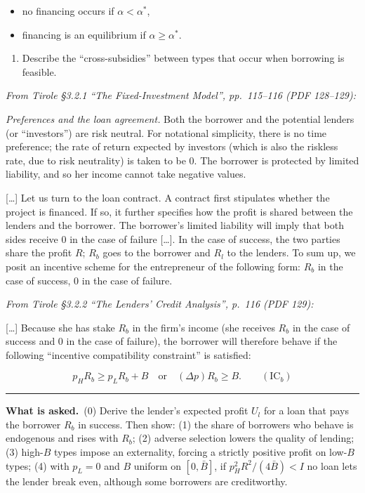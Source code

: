 \documentclass[11pt,a4paper]{article}
\newcommand{\asked}{\par\medskip\noindent\textbf{What is asked.}~}
\providecommand{\tightlist}{\setlength{\itemsep}{0pt}\setlength{\parskip}{0pt}}
\newcommand{\stmtend}{\par\endgroup\nopagebreak\noindent\rule{\linewidth}{0.4pt}\par\medskip}
\begin{document}
\begin{itemize}
\tightlist
\item
  no financing occurs if \(\alpha < \alpha^*\),
\item
  financing is an equilibrium if \(\alpha \geqslant \alpha^*\).
\end{itemize}

\begin{enumerate}
\def\labelenumi{(\roman{enumi})}
\setcounter{enumi}{2}
\tightlist
\item
  Describe the ``cross-subsidies'' between types that occur when borrowing is feasible.
\end{enumerate}

\emph{From Tirole §3.2.1 ``The Fixed-Investment Model'', pp.~115--116 (PDF 128--129):}

\emph{Preferences and the loan agreement.} Both the borrower and the potential lenders (or
``investors'') are risk neutral. For notational simplicity, there is no time preference; the rate of
return expected by investors (which is also the riskless rate, due to risk neutrality) is taken to
be 0. The borrower is protected by limited liability, and so her income cannot take negative values.

{[}\ldots{]} Let us turn to the loan contract. A contract first stipulates whether the project is
financed. If so, it further specifies how the profit is shared between the lenders and the borrower.
The borrower's limited liability will imply that both sides receive 0 in the case of failure
{[}\ldots{]}. In the case of success, the two parties share the profit \(R\); \(R_b\) goes to the
borrower and \(R_l\) to the lenders. To sum up, we posit an incentive scheme for the entrepreneur of
the following form: \(R_b\) in the case of success, 0 in the case of failure.

\emph{From Tirole §3.2.2 ``The Lenders' Credit Analysis'', p.~116 (PDF 129):}

{[}\ldots{]} Because she has stake \(R_b\) in the firm's income (she receives \(R_b\) in the case of
success and 0 in the case of failure), the borrower will therefore behave if the following
``incentive compatibility constraint'' is satisfied:

\[p_H R_b \geqslant p_L R_b + B \quad \text{or} \quad (\Delta p) R_b \geqslant B. \qquad (\text{IC}_b)\]
\stmtend

\asked (0) Derive the lender's expected profit $U_l$ for a loan that pays the borrower $R_b$ in success. Then show: (1) the share of borrowers who behave is endogenous and rises with $R_b$; (2) adverse selection lowers the quality of lending; (3) high-$B$ types impose an externality, forcing a strictly positive profit on low-$B$ types; (4) with $p_L=0$ and $B$ uniform on $[0,\bar B]$, if $p_H^2R^2/(4\bar B)<I$ no loan lets the lender break even, although some borrowers are creditworthy.
\end{document}
